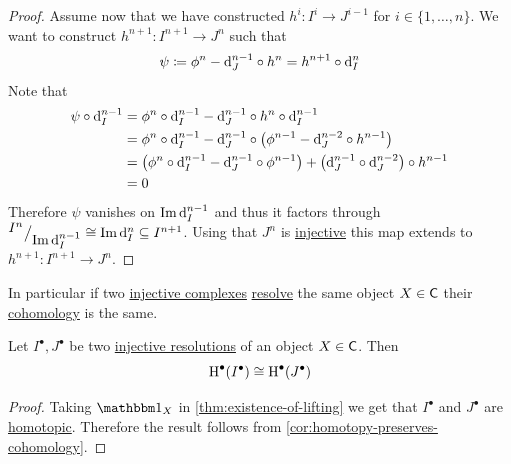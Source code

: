 \documentclass[../../main]{subfiles}
\begin{document}
\begin{proof}
  Assume now that we have constructed \(h^{i}\colon I^{i} \to J^{i-1}\) for \(i \in \{1, \ldots, n\}\).
  We want to construct \(h^{n+1}\colon I^{n+1} \to J^{n}\) such that
  \begin{equation*}
    \psi \coloneq \phi^{n} - \mathrm{d}_{J}^{n-1} \circ h^{n} = h^{n+1} \circ \mathrm{d}_{I}^{n}
  \end{equation*}
  Note that
  \begin{align*}
    \psi \circ \mathrm{d}_{I}^{n-1} &= \phi^{n} \circ \mathrm{d}_{I}^{n-1} - \mathrm{d}_{J}^{n-1} \circ h^{n} \circ \mathrm{d}_{I}^{n-1} \\
                     &= \phi^{n} \circ \mathrm{d}_{I}^{n-1} - \mathrm{d}_{J}^{n-1} \circ \left( \phi^{n-1} - \mathrm{d}_{J}^{n-2} \circ h^{n-1} \right) \\
                     &= \left( \phi^{n} \circ \mathrm{d}_{I}^{n-1} - \mathrm{d}_{J}^{n-1} \circ \phi^{n-1} \right) + \left( \mathrm{d}_{J}^{n-1} \circ \mathrm{d}_{J}^{n-2} \right) \circ h^{n-1} \\
                     &= 0
  \end{align*}
  Therefore \(\psi\) vanishes on \(\operatorname{Im} \mathrm{d}_{I}^{n-1}\) and thus it factors through \({^{\textstyle I^{n}}\big/_{\textstyle \operatorname{Im} \mathrm{d}_{I}^{n-1}}} \cong \operatorname{Im} \mathrm{d}_{I}^{n} \subseteq I^{n+1}\).
  Using that \(J^{n}\) is \hyperref[def:injective-projective-object]{injective} this map extends to \(h^{n+1}\colon I^{n+1} \to J^{n}\).
\end{proof}

In particular if two \hyperref[def:injective-projective-object]{injective complexes} \hyperref[def:resolution]{resolve} the same object \(X \in \mathsf{C}\) their \hyperref[def:cohomology]{cohomology} is the same.
\begin{corollary}
  Let \(I^{\bullet}, J^{\bullet}\) be two \hyperref[def:resolution]{injective resolutions} of an object \(X \in \mathsf{C}\).
  Then
  \begin{equation*}
    \operatorname{H}^{\bullet}(I^{\bullet}) \cong \operatorname{H}^{\bullet}(J^{\bullet})
  \end{equation*}
\end{corollary}
\begin{proof}
  Taking \(\id_{X}\) in \autoref{thm:existence-of-lifting} we get that \(I^{\bullet}\) and \(J^{\bullet}\) are \hyperref[def:homotopy]{homotopic}.
  Therefore the result follows from \autoref{cor:homotopy-preserves-cohomology}.
\end{proof}
\end{document}
